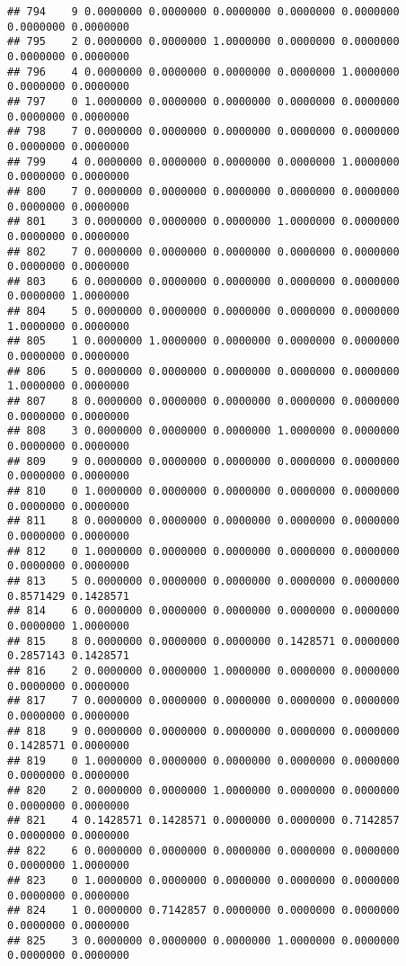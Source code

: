 \documentclass[
]{article}
\begin{document}
\begin{verbatim}
## 794    9 0.0000000 0.0000000 0.0000000 0.0000000 0.0000000 0.0000000 0.0000000
## 795    2 0.0000000 0.0000000 1.0000000 0.0000000 0.0000000 0.0000000 0.0000000
## 796    4 0.0000000 0.0000000 0.0000000 0.0000000 1.0000000 0.0000000 0.0000000
## 797    0 1.0000000 0.0000000 0.0000000 0.0000000 0.0000000 0.0000000 0.0000000
## 798    7 0.0000000 0.0000000 0.0000000 0.0000000 0.0000000 0.0000000 0.0000000
## 799    4 0.0000000 0.0000000 0.0000000 0.0000000 1.0000000 0.0000000 0.0000000
## 800    7 0.0000000 0.0000000 0.0000000 0.0000000 0.0000000 0.0000000 0.0000000
## 801    3 0.0000000 0.0000000 0.0000000 1.0000000 0.0000000 0.0000000 0.0000000
## 802    7 0.0000000 0.0000000 0.0000000 0.0000000 0.0000000 0.0000000 0.0000000
## 803    6 0.0000000 0.0000000 0.0000000 0.0000000 0.0000000 0.0000000 1.0000000
## 804    5 0.0000000 0.0000000 0.0000000 0.0000000 0.0000000 1.0000000 0.0000000
## 805    1 0.0000000 1.0000000 0.0000000 0.0000000 0.0000000 0.0000000 0.0000000
## 806    5 0.0000000 0.0000000 0.0000000 0.0000000 0.0000000 1.0000000 0.0000000
## 807    8 0.0000000 0.0000000 0.0000000 0.0000000 0.0000000 0.0000000 0.0000000
## 808    3 0.0000000 0.0000000 0.0000000 1.0000000 0.0000000 0.0000000 0.0000000
## 809    9 0.0000000 0.0000000 0.0000000 0.0000000 0.0000000 0.0000000 0.0000000
## 810    0 1.0000000 0.0000000 0.0000000 0.0000000 0.0000000 0.0000000 0.0000000
## 811    8 0.0000000 0.0000000 0.0000000 0.0000000 0.0000000 0.0000000 0.0000000
## 812    0 1.0000000 0.0000000 0.0000000 0.0000000 0.0000000 0.0000000 0.0000000
## 813    5 0.0000000 0.0000000 0.0000000 0.0000000 0.0000000 0.8571429 0.1428571
## 814    6 0.0000000 0.0000000 0.0000000 0.0000000 0.0000000 0.0000000 1.0000000
## 815    8 0.0000000 0.0000000 0.0000000 0.1428571 0.0000000 0.2857143 0.1428571
## 816    2 0.0000000 0.0000000 1.0000000 0.0000000 0.0000000 0.0000000 0.0000000
## 817    7 0.0000000 0.0000000 0.0000000 0.0000000 0.0000000 0.0000000 0.0000000
## 818    9 0.0000000 0.0000000 0.0000000 0.0000000 0.0000000 0.1428571 0.0000000
## 819    0 1.0000000 0.0000000 0.0000000 0.0000000 0.0000000 0.0000000 0.0000000
## 820    2 0.0000000 0.0000000 1.0000000 0.0000000 0.0000000 0.0000000 0.0000000
## 821    4 0.1428571 0.1428571 0.0000000 0.0000000 0.7142857 0.0000000 0.0000000
## 822    6 0.0000000 0.0000000 0.0000000 0.0000000 0.0000000 0.0000000 1.0000000
## 823    0 1.0000000 0.0000000 0.0000000 0.0000000 0.0000000 0.0000000 0.0000000
## 824    1 0.0000000 0.7142857 0.0000000 0.0000000 0.0000000 0.0000000 0.0000000
## 825    3 0.0000000 0.0000000 0.0000000 1.0000000 0.0000000 0.0000000 0.0000000

\end{verbatim}
\end{document}
